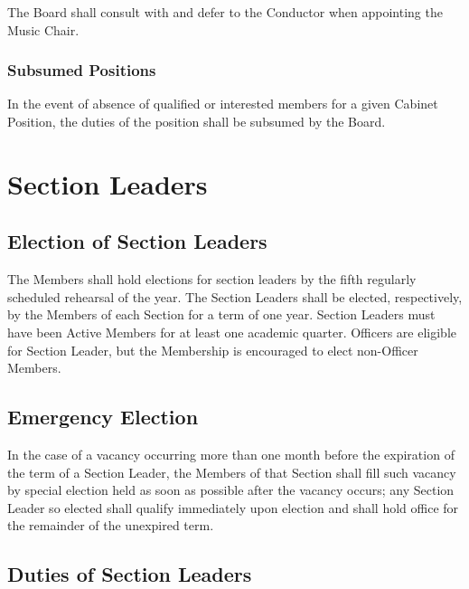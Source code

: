 \documentclass{article}
\begin{document}
The Board shall consult with and defer to the Conductor when
appointing the Music Chair.

\subsubsection{Subsumed Positions}

In the event of absence of qualified or interested members for a given
Cabinet Position, the duties of the position shall be subsumed by
the Board.

\section{Section Leaders} \label{section_leaders}

\subsection{Election of Section Leaders}

The Members shall hold elections for section leaders by the fifth
regularly scheduled rehearsal of the year. The Section Leaders shall
be elected, respectively, by the Members of each Section for a term
of one year. Section Leaders must have been Active Members for at
least one academic quarter. Officers are eligible for Section Leader,
but the Membership is encouraged to elect non-Officer Members.

\subsection{Emergency Election}

In the case of a vacancy occurring more than one month before the
expiration of the term of a Section Leader, the Members of that Section
shall fill such vacancy by special election held as soon as possible
after the vacancy occurs; any Section Leader so elected shall qualify
immediately upon election and shall hold office for the remainder
of the unexpired term.

\subsection{Duties of Section Leaders}
\end{document}
